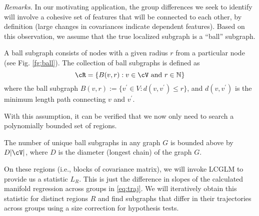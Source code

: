 {\em Remarks.} In our motivating application, the group differences we seek to identify will involve a cohesive set of features that will be 
connected to each other, by definition (large changes in covariances indicate dependent features). 
Based on this observation, we assume that the true localized subgraph is a ``ball'' subgraph. 
\begin{definition} A ball subgraph consists of nodes with a given radius $r$ from a particular node (see Fig. \ref{fg:ball}). The collection of ball subgraphs is defined as
\begin{equation}
\cR=\left\{B(v,r):v\in \cV\ {\rm and}\ r\in \NN\right\}
\end{equation}
where the ball subgraph $B(v,r):=\{v^\prime \in V:d(v,v^\prime)\le r\}$, and $d(v,v^\prime)$ is the minimum length path connecting $v$ and $v^\prime$.
\end{definition}
%
With this assumption, it can be verified that we now only need to search a polynomially bounded set of regions.
\begin{remark}
The number of unique ball subgraphs in any graph $G$ is bounded above by $D|\cV|$, where $D$ is the diameter (longest chain) of the graph $G$.
\end{remark}
 On these regions 
(i.e., blocks of covariance matrix), 
we will invoke LCGLM to provide us a statistic $L_R$. This is just the difference in slopes of the calculated manifold regression across groups in \eqref{eq:traj}. 
We will iteratively obtain this statistic for distinct regions $R$ and find subgraphs that differ in their trajectories across groups using a size correction for hypothesis tests.
